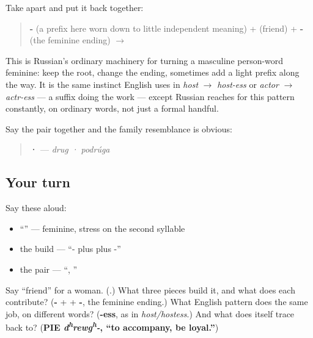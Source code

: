 \begin{grammarlens}[title={Grammar Lens: watch the word get built}]
Take \emph{} apart and put it back together:

\begin{quote}
\textbf{-} (a prefix here worn down to little independent meaning) + \textbf{} (friend) + \textbf{-} (the feminine ending) $\to$ \textbf{}
\end{quote}

This is Russian's ordinary machinery for turning a masculine person-word feminine: keep the root, change the ending, sometimes add a light prefix along the way. It is the same instinct English uses in \emph{host} $\to$ \emph{host-ess} or \emph{actor} $\to$ \emph{actr-ess} — a suffix doing the work — except Russian reaches for this pattern constantly, on ordinary words, not just a formal handful.

Say the pair together and the family resemblance is obvious:

\begin{quote}
\textbf{ · } — \emph{drug · podrúga}
\end{quote}
\end{grammarlens}

\subsection*{Your turn}
Say these aloud:

\begin{itemize}
\raggedright
  \item \textquotedblleft{}\textquotedblright{} — feminine, stress on the second syllable
  \item the build — \textquotedblleft{}- plus  plus -\textquotedblright{}
  \item the pair — \textquotedblleft{}, \textquotedblright{}
\end{itemize}

\begin{tcolorbox}[breakable,colback=teal!4,colframe=teal!35!black,title={Before you move on}]
Say \textquotedblleft{}friend\textquotedblright{} for a woman. (\textbf{}.) What three pieces build it, and what does each contribute? (\textbf{-} + \textbf{} + \textbf{-}, the feminine ending.) What English pattern does the same job, on different words? (\textbf{-ess}, as in \emph{host/hostess}.) And what does \emph{} itself trace back to? (\textbf{PIE \emph{d\textsuperscript{h}rewg\textsuperscript{h}-}, \textquotedblleft{}to accompany, be loyal.\textquotedblright{}})
\end{tcolorbox}
